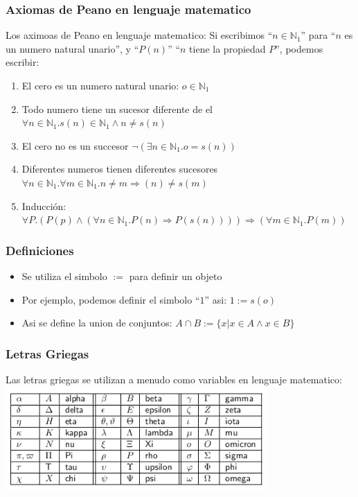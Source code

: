 \documentclass{beamer}
\begin{document}
\begin{frame}
\frametitle{Axiomas de Peano en lenguaje matematico}
Los aximoas de Peano en lenguaje matematico: Si escribimos
``$n\in\mathbb{N}_1$'' para ``$n$ es un numero natural unario'', y
``$P(n)$'' ``$n$ tiene la propiedad $P$'', podemos escribir:
\begin{enumerate}
\item{El cero es un numero natural unario: $o\in \mathbb{N}_1$}
\item{Todo numero tiene un sucesor diferente de el$\forall n \in \mathbb{N}_1.s(n)\in\mathbb{N}_1\wedge n\neq s(n)$}
\item{El cero no es un succesor $\neg(\exists n \in\mathbb{N}_1.o=s(n))$}
\item{Diferentes numeros tienen diferentes sucesores$\forall n \in\mathbb{N}_1.\forall m\in\mathbb{N}_1.n\neq m\Rightarrow(n)\neq s(m)$}
\item{Inducci\'on: $\forall P.(P(p)\wedge(\forall n \in \mathbb{N}_1
.P(n)\Rightarrow P(s(n))))\Rightarrow (\forall m\in\mathbb{N}_1.P(m))$}

\end{enumerate}
\end{frame}

\begin{frame}
\frametitle{Definiciones}
\begin{itemize}
    \item{Se utiliza el simbolo $:=$ para definir un objeto}
    \item{Por ejemplo, podemos definir el simbolo ``$1$'' asi: $1:=s(o)$}
    \item{Asi se define la union de conjuntos: $A\cap B:=\{
        x|x\in A \wedge x\in B\}$}
\end{itemize}
\end{frame}

\begin{frame}
\frametitle{Letras Griegas}
Las letras griegas se utilizan a menudo como variables en
lenguaje matematico:
\includegraphics[width=10cm]{greek.png}
\end{frame}
\end{document}
